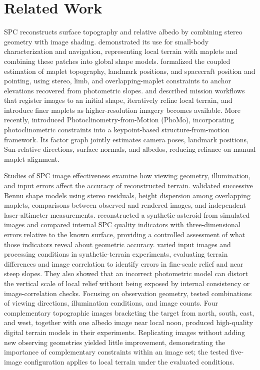 \section{Related Work}
\label{sec:related-work}

SPC reconstructs surface topography and relative albedo by combining stereo geometry with image shading. \citet{gaskell2008} demonstrated its use for small-body characterization and navigation, representing local terrain with maplets and combining these patches into global shape models. \citet{gaskell2023} formalized the coupled estimation of maplet topography, landmark positions, and spacecraft position and pointing, using stereo, limb, and overlapping-maplet constraints to anchor elevations recovered from photometric slopes. \citet{barnouin2020} and \citet{palmer2022} described mission workflows that register images to an initial shape, iteratively refine local terrain, and introduce finer maplets as higher-resolution imagery becomes available. More recently, \citet{driver2025} introduced Photoclinometry-from-Motion (PhoMo), incorporating photoclinometric constraints into a keypoint-based structure-from-motion framework. Its factor graph jointly estimates camera poses, landmark positions, Sun-relative directions, surface normals, and albedos, reducing reliance on manual maplet alignment.

Studies of SPC image effectiveness examine how viewing geometry, illumination, and input errors affect the accuracy of reconstructed terrain. \citet{alasad2021} validated successive Bennu shape models using stereo residuals, height dispersion among overlapping maplets, comparisons between observed and rendered images, and independent laser-altimeter measurements. \citet{weirich2022} reconstructed a synthetic asteroid from simulated images and compared internal SPC quality indicators with three-dimensional errors relative to the known surface, providing a controlled assessment of what those indicators reveal about geometric accuracy. \citet{palmer2024accuracy} varied input images and processing conditions in synthetic-terrain experiments, evaluating terrain differences and image correlation to identify errors in fine-scale relief and near steep slopes. They also showed that an incorrect photometric model can distort the vertical scale of local relief without being exposed by internal consistency or image-correlation checks. Focusing on observation geometry, \citet{palmer2024geometry} tested combinations of viewing directions, illumination conditions, and image counts. Four complementary topographic images bracketing the target from north, south, east, and west, together with one albedo image near local noon, produced high-quality digital terrain models in their experiments. Replicating images without adding new observing geometries yielded little improvement, demonstrating the importance of complementary constraints within an image set; the tested five-image configuration applies to local terrain under the evaluated conditions.

